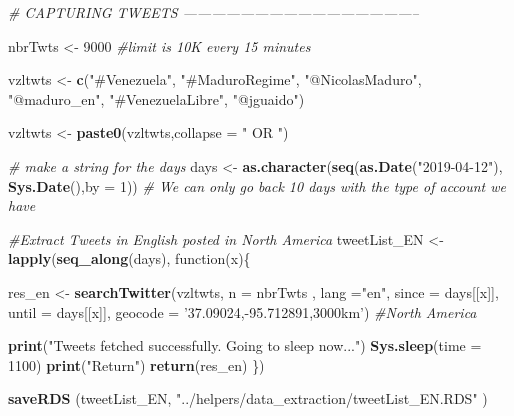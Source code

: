 \documentclass[]{article}
\newenvironment{Shaded}{\begin{snugshade}}{\end{snugshade}}
\newcommand{\KeywordTok}[1]{\textcolor[rgb]{0.13,0.29,0.53}{\textbf{{#1}}}}
\newcommand{\DataTypeTok}[1]{\textcolor[rgb]{0.13,0.29,0.53}{{#1}}}
\newcommand{\DecValTok}[1]{\textcolor[rgb]{0.00,0.00,0.81}{{#1}}}
\newcommand{\StringTok}[1]{\textcolor[rgb]{0.31,0.60,0.02}{{#1}}}
\newcommand{\CommentTok}[1]{\textcolor[rgb]{0.56,0.35,0.01}{\textit{{#1}}}}
\newcommand{\NormalTok}[1]{{#1}}
\begin{document}
\begin{Shaded}
\begin{Highlighting}[]
\CommentTok{# CAPTURING TWEETS --------------------------------------------------}

\NormalTok{nbrTwts <-}\StringTok{ }\DecValTok{9000} \CommentTok{#limit is 10K every 15 minutes}

\NormalTok{vzltwts <-}\StringTok{ }\KeywordTok{c}\NormalTok{(}\StringTok{"#Venezuela"}\NormalTok{, }\StringTok{"#MaduroRegime"}\NormalTok{, }
             \StringTok{"@NicolasMaduro"}\NormalTok{, }\StringTok{"@maduro_en"}\NormalTok{,}
             \StringTok{"#VenezuelaLibre"}\NormalTok{, }\StringTok{"@jguaido"}\NormalTok{)}


\NormalTok{vzltwts <-}\StringTok{ }\KeywordTok{paste0}\NormalTok{(vzltwts,}\DataTypeTok{collapse =} \StringTok{" OR "}\NormalTok{)}

\CommentTok{# make a string for the days}
\NormalTok{days <-}\StringTok{ }\KeywordTok{as.character}\NormalTok{(}\KeywordTok{seq}\NormalTok{(}\KeywordTok{as.Date}\NormalTok{(}\StringTok{"2019-04-12"}\NormalTok{), }\KeywordTok{Sys.Date}\NormalTok{(),}\DataTypeTok{by =} \DecValTok{1}\NormalTok{)) }\CommentTok{# We can only go back 10 days with the type of account we have}


\CommentTok{#Extract Tweets in English posted in North America}
\NormalTok{tweetList_EN <-}\StringTok{ }\KeywordTok{lapply}\NormalTok{(}\KeywordTok{seq_along}\NormalTok{(days), function(x)\{}
  
  \NormalTok{res_en <-}\StringTok{ }\KeywordTok{searchTwitter}\NormalTok{(vzltwts,}
                \DataTypeTok{n =} \NormalTok{nbrTwts ,}
                \DataTypeTok{lang =}\StringTok{"en"}\NormalTok{,}
                \DataTypeTok{since =} \NormalTok{days[[x]],}
                \DataTypeTok{until =} \NormalTok{days[[x]],}
                \DataTypeTok{geocode =} \StringTok{'37.09024,-95.712891,3000km'}\NormalTok{) }\CommentTok{#North America}
  
  \KeywordTok{print}\NormalTok{(}\StringTok{"Tweets fetched successfully. Going to sleep now..."}\NormalTok{)}
  \KeywordTok{Sys.sleep}\NormalTok{(}\DataTypeTok{time =} \DecValTok{1100}\NormalTok{)}
  \KeywordTok{print}\NormalTok{(}\StringTok{"Return"}\NormalTok{)}
  \KeywordTok{return}\NormalTok{(res_en)}
\NormalTok{\})}

\KeywordTok{saveRDS} \NormalTok{(tweetList_EN, }\StringTok{"../helpers/data_extraction/tweetList_EN.RDS"} \NormalTok{)}
\end{Highlighting}
\end{Shaded}
\end{document}
